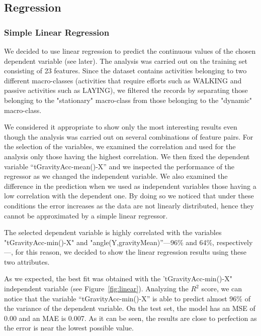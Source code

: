 \documentclass[10pt, a4paper, twocolumn]{article}
\begin{document}
\subsection{Regression}

\subsubsection*{Simple Linear Regression}

We decided to use linear regression to predict the continuous values of the chosen dependent variable (see later). The analysis was carried out on the training set consisting of 23 features. Since the dataset contains activities belonging to two different macro-classes (activities that require efforts such as WALKING and passive activities such as LAYING), we filtered the records by separating those belonging to the "stationary" macro-class from those belonging to the "dynamic" macro-class.

We considered it appropriate to show only the most interesting results even though the analysis was carried out on several combinations of feature pairs. For the selection of the variables, we examined the correlation and used for the analysis only those having the highest correlation. We then fixed the dependent variable “tGravityAcc-mean()-X” and we inspected the performance of the regressor as we changed the independent variable. We also examined the difference in the prediction when we used as independent variables those having a low correlation with the dependent one. By doing so we noticed that under these conditions the error increases as the data are not linearly distributed, hence they cannot be approximated by a simple linear regressor.

The selected dependent variable is highly correlated with the variables "tGravityAcc-min()-X" and "angle(Y,gravityMean)”---96\% and 64\%, respectively---, for this reason, we decided to show the linear regression results using these two attributes.

As we expected, the best fit was obtained with the 'tGravityAcc-min()-X" independent variable (see Figure~\ref{fig:linear}). Analyzing the $R^2$ score, we can notice that the variable “tGravityAcc-min()-X” is able to predict almost 96\% of the variance of the dependent variable. On the test set, the model has an MSE of 0.00 and an MAE is 0.007. As it can be seen, the results are close to perfection as the error is near the lowest possible value.
\end{document}
